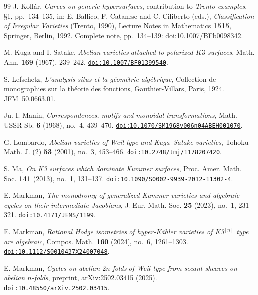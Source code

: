 \documentclass[11pt,reqno]{amsart}
\numberwithin{equation}{section}
\theoremstyle{plain}
\theoremstyle{definition}
\begin{document}
\begin{thebibliography}{99}
J. Koll\'ar, \emph{Curves on generic hypersurfaces}, contribution to
\emph{Trento examples}, \S1, pp.~134--135, in:
E. Ballico, F. Catanese and C. Ciliberto (eds.),
\emph{Classification of Irregular Varieties} (Trento, 1990),
Lecture Notes in Mathematics \textbf{1515}, Springer, Berlin, 1992.
Complete note, pp.~134--139:
\href{https://doi.org/10.1007/BFb0098342}{doi:10.1007/BFb0098342}.

M. Kuga and I. Satake,
\emph{Abelian varieties attached to polarized $K3$-surfaces},
Math. Ann. \textbf{169} (1967), 239--242.
\href{https://doi.org/10.1007/BF01399540}{\nolinkurl{doi:10.1007/BF01399540}}.

S. Lefschetz,
\emph{L'analysis situs et la g\'eom\'etrie alg\'ebrique},
Collection de monographies sur la th\'eorie des fonctions, Gauthier-Villars, Paris, 1924. JFM~50.0663.01.

Ju. I. Manin,
\emph{Correspondences, motifs and monoidal transformations},
Math. USSR-Sb. \textbf{6} (1968), no.~4, 439--470.
\href{https://doi.org/10.1070/SM1968v006n04ABEH001070}{\nolinkurl{doi:10.1070/SM1968v006n04ABEH001070}}.

G. Lombardo,
\emph{Abelian varieties of Weil type and Kuga--Satake varieties},
Tohoku Math. J. (2) \textbf{53} (2001), no.~3, 453--466.
\href{https://doi.org/10.2748/tmj/1178207420}{\nolinkurl{doi:10.2748/tmj/1178207420}}.

S. Ma,
\emph{On K3 surfaces which dominate Kummer surfaces},
Proc. Amer. Math. Soc. \textbf{141} (2013), no.~1, 131--137.
\href{https://doi.org/10.1090/S0002-9939-2012-11302-4}{\nolinkurl{doi:10.1090/S0002-9939-2012-11302-4}}.

E. Markman,
\emph{The monodromy of generalized Kummer varieties and algebraic cycles on their intermediate Jacobians},
J. Eur. Math. Soc. \textbf{25} (2023), no.~1, 231--321.
\href{https://doi.org/10.4171/JEMS/1199}{\nolinkurl{doi:10.4171/JEMS/1199}}.

E. Markman,
\emph{Rational Hodge isometries of hyper-K\"ahler varieties of K3$^{[n]}$
type are algebraic},
Compos. Math. \textbf{160} (2024), no.~6, 1261--1303.
\href{https://doi.org/10.1112/S0010437X24007048}{\nolinkurl{doi:10.1112/S0010437X24007048}}.

E. Markman,
\emph{Cycles on abelian $2n$-folds of Weil type from secant sheaves on abelian
$n$-folds}, preprint, arXiv:2502.03415 (2025).
\href{https://doi.org/10.48550/arXiv.2502.03415}{\nolinkurl{doi:10.48550/arXiv.2502.03415}}.


\end{thebibliography}
\end{document}
